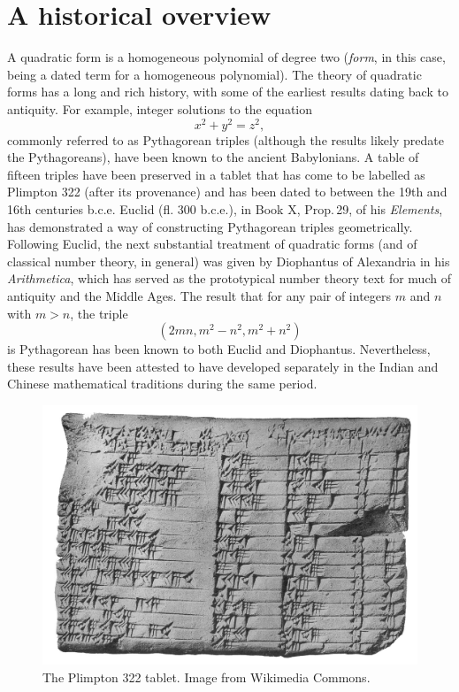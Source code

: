 
\chapter{A historical overview}
\label{chap:history}


A quadratic form is a homogeneous polynomial of degree two (\emph{form}, in this case, being a dated term for a homogeneous polynomial). The theory of quadratic forms has a long and rich history, with some of the earliest results dating back to antiquity. For example, integer solutions to the equation
\[
    x^2 + y^2 = z^2,
\]
commonly referred to as Pythagorean triples (although the results likely predate the Pythagoreans), have been known to the ancient Babylonians. A table of fifteen triples have been preserved in a tablet that has come to be labelled as Plimpton 322 (after its provenance) and has been dated to between the 19th and 16th centuries {\sc b.c.e.} \cite{robson2002words} Euclid (fl. 300 {\sc b.c.e.}), in Book X, Prop.\,29, of his \emph{Elements}, has demonstrated a way of constructing Pythagorean triples geometrically.\,\cite{euclid1956elements} Following Euclid, the next substantial treatment of quadratic forms (and of classical number theory, in general) was given by Diophantus of Alexandria in his \emph{Arithmetica}, which has served as the prototypical number theory text for much of antiquity and the Middle Ages. \cite{katz2009history} The result that for any pair of integers \(m\) and \(n\) with \(m > n\), the triple
\[
    (2mn, m^2 - n^2, m^2 + n^2)
\]
is Pythagorean has been known to both Euclid and Diophantus. Nevertheless, these results have been attested to have developed separately in the Indian and Chinese mathematical traditions during the same period. \cite{weil1984number}


\begin{figure}
    \centering
    \includegraphics[width=\textwidth]{assets/Plimpton_322.jpg}
    \caption[The Plimpton 322 tablet.]{The Plimpton 322 tablet. Image from Wikimedia Commons.}
    \label{fig:plimpton-322}
\end{figure}

